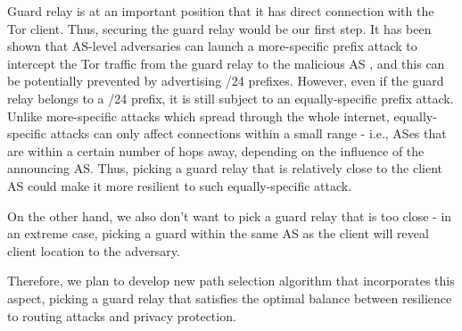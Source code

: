 Guard relay is at an important position that it has direct connection with the Tor client. Thus, securing the guard relay would be our first step. It has been shown that AS-level adversaries can launch a more-specific prefix attack to intercept the Tor traffic from the guard relay to the malicious AS \cite{sun2015raptor}, and this can be potentially prevented by advertising /24 prefixes. However, even if the guard relay belongs to a /24 prefix, it is still subject to an equally-specific prefix attack. Unlike more-specific attacks which spread through the whole internet, equally-specific attacks can only affect connections within a small range - i.e., ASes that are within a certain number of hops away, depending on the influence of the announcing AS. Thus, picking a guard relay that is relatively close to the client AS could make it more resilient to such equally-specific attack.

On the other hand, we also don't want to pick a guard relay that is too close - in an extreme case, picking a guard within the same AS as the client will reveal client location to the adversary. 

Therefore, we plan to develop new path selection algorithm that incorporates this aspect, picking a guard relay that satisfies the optimal balance between resilience to routing attacks and privacy protection. 
